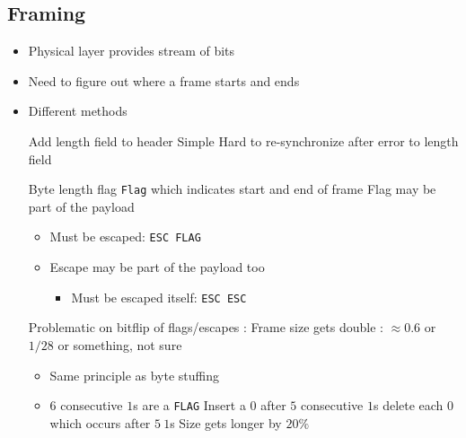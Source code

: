 \subsection{Framing}
\begin{itemize}
    \item Physical layer provides stream of bits
    \item Need to figure out where a frame starts and ends
    \item Different methods
        \begin{itemize}
             Add length field to header
            \ipro Simple
            \icon Hard to re-synchronize after error to length field
        \end{itemize}
        \begin{itemize}
             Byte length flag \verb+Flag+ which indicates start and end of frame
            \icon Flag may be part of the payload
                \begin{itemize}
                    \item Must be escaped: \verb+ESC FLAG+
                    \item Escape may be part of the payload too
                        \begin{itemize}
                            \item Must be escaped itself: \verb+ESC ESC+
                        \end{itemize}
                \end{itemize}
            \icon Problematic on bitflip of flags/escapes
            : Frame size gets double
            : $\approx 0.6$ or $1/28$ or something, not sure 
        \end{itemize}
        \begin{itemize}
            \item Same principle as byte stuffing
            \item $6$ consecutive $1$s are a \verb+FLAG+
             Insert a $0$ after $5$ consecutive $1$s
             delete each $0$ which occurs after $5 \ 1$s
             Size gets longer by $20\%$
             
        \end{itemize}
\end{itemize}


